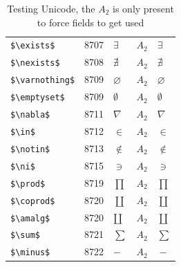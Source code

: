 ﻿\documentclass{article}
\begin{document}
\begin{table}
\begin{center}
\begin{tabular}{llll}
 \verb#$\exists$#              & 8707    & $\exists$              & $A_2\quad \exists$\\
 \verb#$\nexists$#             & 8708    & $\nexists$             & $A_2\quad \nexists$\\
 \verb#$\varnothing$#          & 8709    & $\varnothing$          & $A_2\quad \varnothing$\\
 \verb#$\emptyset$#            & 8709    & $\emptyset$            & $A_2\quad \emptyset$\\
 \verb#$\nabla$#               & 8711    & $\nabla$               & $A_2\quad \nabla$\\
 \verb#$\in$#                  & 8712    & $\in$                  & $A_2\quad \in$\\
 \verb#$\notin$#               & 8713    & $\notin$               & $A_2\quad \notin$\\
 \verb#$\ni$#                  & 8715    & $\ni$                  & $A_2\quad \ni$\\
 \verb#$\prod$#                & 8719    & $\prod$                & $A_2\quad \prod$\\
 \verb#$\coprod$#              & 8720    & $\coprod$              & $A_2\quad \coprod$\\
 \verb#$\amalg$#               & 8720    & $\amalg$               & $A_2\quad \amalg$\\
 \verb#$\sum$#                 & 8721    & $\sum$                 & $A_2\quad \sum$\\
 \verb#$\minus$#               & 8722    & $\minus$               & $A_2\quad \minus$\\
\end{tabular}
\end{center}
\caption{Testing Unicode, the $A_2$ is only present to force fields to get used}
\end{table}
\clearpage
\end{document}
